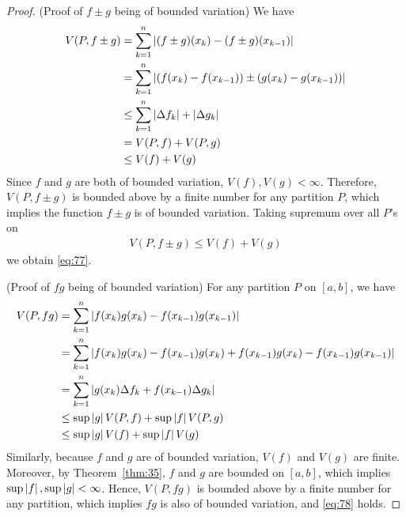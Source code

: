 \documentclass[thmcnt=section, 12pt]{my-elegantbook}
\begin{document}
\begin{proof}
    (Proof of $f \pm g$ being of bounded variation) We have
    \begin{align*}
        V(P, f \pm g)
         & = \sum_{k=1}^n \left\lvert (f \pm g)(x_k) - (f \pm g)(x_{k-1}) \right\rvert                 \\
         & = \sum_{k=1}^n \left\lvert ( f(x_k) - f(x_{k-1}) ) \pm ( g(x_k) - g(x_{k-1}) ) \right\rvert \\
         & \leq \sum_{k=1}^n \left\lvert \Delta f_k \right\rvert + \left\lvert \Delta g_k \right\rvert                    \\
         & = V(P, f) + V(P, g)                                                      \\
         & \leq V(f) + V(g)
    \end{align*}
    Since $f$ and $g$ are both of bounded variation, $V(f), V(g) < \infty$. Therefore, $V(P, f \pm g)$ is bounded above by a finite number for any partition $P$, which implies the function $f \pm g$ is of bounded variation. Taking supremum over all $P$'s on
    \begin{align*}
        V(P, f \pm g) \leq V(f) + V(g)
    \end{align*}
    we obtain \eqref{eq:77}.

    \par (Proof of $f g$ being of bounded variation) For any partition $P$ on $[a, b]$, we have
    \begin{align*}
        V(P, f g)
         & = \sum_{k=1}^n \left\lvert f(x_k) g(x_k) - f(x_{k-1}) g(x_{k-1}) \right\rvert \\
         & = \sum_{k=1}^n \left\lvert 
            f(x_k) g(x_k)
            - f(x_{k-1}) g(x_k)
            + f(x_{k-1}) g(x_k)
            - f(x_{k-1}) g(x_{k-1})
         \right\rvert                                                             \\
         & = \sum_{k=1}^n \left\lvert 
            g(x_k) \Delta f_k
            + f(x_{k-1}) \Delta g_k
         \right\rvert                                                             \\
         & \leq \sup\left\lvert g \right\rvert V(P, f) + \sup\left\lvert f \right\rvert V(P, g)             \\
         & \leq \sup\left\lvert g \right\rvert V(f) + \sup\left\lvert f \right\rvert V(g)
    \end{align*}
    Similarly, because $f$ and $g$ are of bounded variation, $V(f)$ and $V(g)$ are finite. Moreover, by Theorem~\ref{thm:35}, $f$ and $g$ are bounded on $[a, b]$, which implies $\sup\left\lvert f \right\rvert, \sup\left\lvert g \right\rvert < \infty$. Hence, $V(P, f g)$ is bounded above by a finite number for any partition, which implies $fg$ is also of bounded variation, and \eqref{eq:78} holds.
\end{proof}
\end{document}
